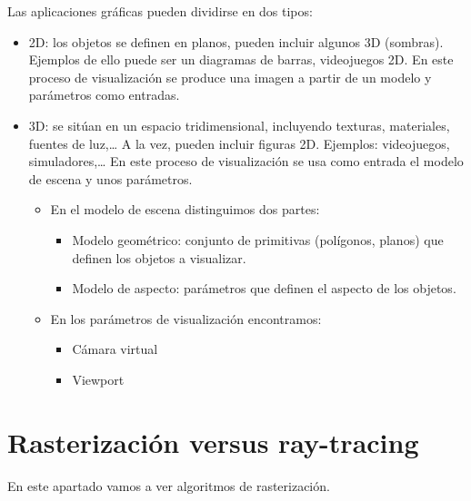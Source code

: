 \documentclass[12pt]{report} %
\providecommand{\tightlist}{%
  \setlength{\itemsep}{0pt}\setlength{\parskip}{0pt}}
\begin{document}
Las aplicaciones gráficas pueden dividirse en dos tipos:

\begin{itemize}
\tightlist
\item
  2D: los objetos se definen en planos, pueden incluir algunos 3D
  (sombras). Ejemplos de ello puede ser un diagramas de barras,
  videojuegos 2D. En este proceso de visualización se produce una imagen
  a partir de un modelo y parámetros como entradas.\\
\item
  3D: se sitúan en un espacio tridimensional, incluyendo texturas,
  materiales, fuentes de luz,\ldots{} A la vez, pueden incluir figuras
  2D. Ejemplos: videojuegos, simuladores,\ldots{} En este proceso de
  visualización se usa como entrada el modelo de escena y unos
  parámetros.

  \begin{itemize}
  \tightlist
  \item
    En el modelo de escena distinguimos dos partes:

    \begin{itemize}
    \tightlist
    \item
      Modelo geométrico: conjunto de primitivas (polígonos, planos) que
      definen los objetos a visualizar.\\
    \item
      Modelo de aspecto: parámetros que definen el aspecto de los
      objetos.\\
    \end{itemize}
  \item
    En los parámetros de visualización encontramos:

    \begin{itemize}
    \tightlist
    \item
      Cámara virtual\\
    \item
      Viewport
    \end{itemize}
  \end{itemize}
\end{itemize}

\hypertarget{rasterizaciuxf3n-versus-ray-tracing}{%
\section{Rasterización versus
ray-tracing}\label{rasterizaciuxf3n-versus-ray-tracing}}

En este apartado vamos a ver algoritmos de rasterización.
\end{document}
